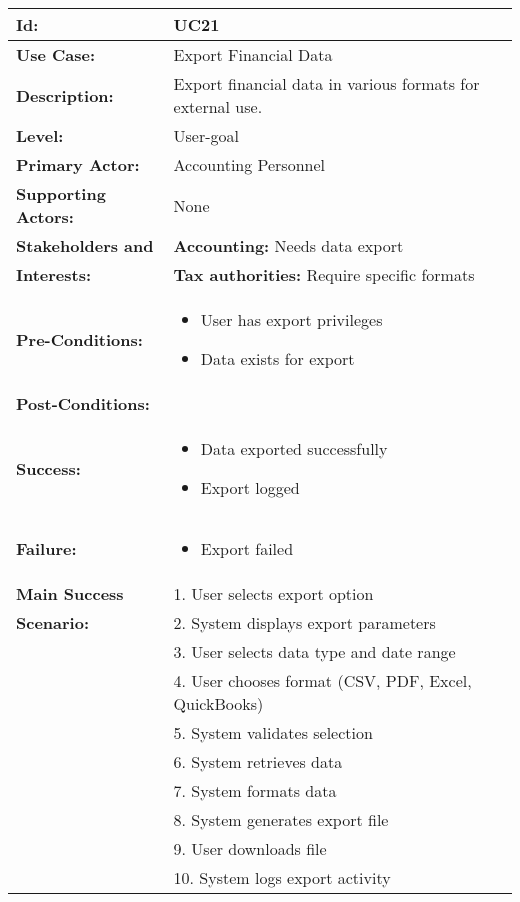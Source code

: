 \documentclass[12pt]{article}
\begin{document}
\begin{longtable}{|p{3cm}|p{11cm}|}
\hline
\textbf{Id:} & UC21 \\
\hline
\textbf{Use Case:} & Export Financial Data \\
\hline
\textbf{Description:} & Export financial data in various formats for external use. \\
\hline
\textbf{Level:} & User-goal \\
\hline
\textbf{Primary Actor:} & Accounting Personnel \\
\hline
\textbf{Supporting Actors:} & None \\
\hline
\textbf{Stakeholders and} & \textbf{Accounting:} Needs data export \\
\textbf{Interests:} & \textbf{Tax authorities:} Require specific formats \\
\hline
\textbf{Pre-Conditions:} & 
\begin{itemize}
    \item User has export privileges
    \item Data exists for export
\end{itemize} \\
\hline
\textbf{Post-Conditions:} & \\
\textbf{Success:} & 
\begin{itemize}
    \item Data exported successfully
    \item Export logged
\end{itemize} \\
\textbf{Failure:} & 
\begin{itemize}
    \item Export failed
\end{itemize} \\
\hline
\textbf{Main Success} & 1. User selects export option \\
\textbf{Scenario:} & 2. System displays export parameters \\
& 3. User selects data type and date range \\
& 4. User chooses format (CSV, PDF, Excel, QuickBooks) \\
& 5. System validates selection \\
& 6. System retrieves data \\
& 7. System formats data \\
& 8. System generates export file \\
& 9. User downloads file \\
& 10. System logs export activity \\

\end{longtable}
\end{document}
